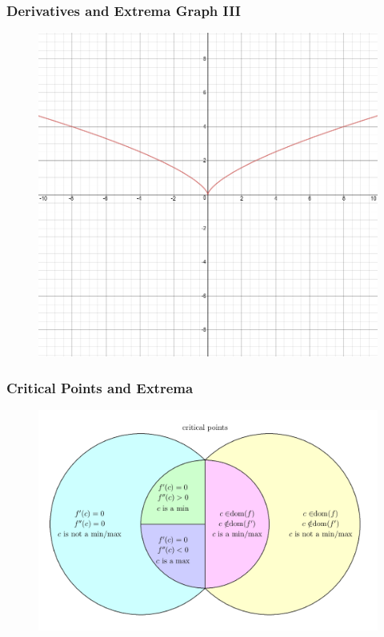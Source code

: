 \documentclass[xcolor=dvipsnames]{beamer}
\begin{document}
\begin{frame}
  \frametitle{Derivatives and Extrema Graph III}
  \begin{figure}[h]
    \includegraphics[scale=.3]{./diagrams/extrema3.png}
  \end{figure}
\end{frame}

\begin{frame}
  \frametitle{Critical Points and Extrema}
  \begin{figure}[h]
    \includegraphics[scale=.3]{./diagrams/opt.png}
  \end{figure}
\end{frame}
\end{document}
